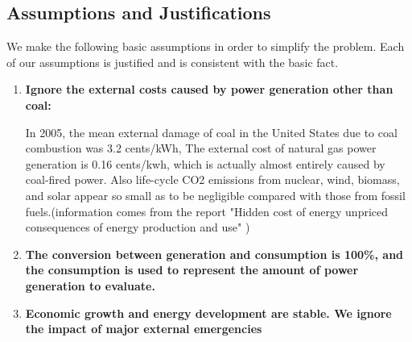 \documentclass{mcmthesis}
\begin{document}
    \subsection{Assumptions and Justifications}
        \noindent
        We make the following basic assumptions in order to simplify the problem. Each of our assumptions is justified and is consistent with the basic fact.
        \begin{enumerate}
            \item \textbf{Ignore the external costs caused by power generation other than coal:}

              In 2005, the mean external damage of coal in the United States due to coal combustion was 3.2 cents/kWh, The external cost of natural gas power generation is 0.16 cents/kwh, which is actually almost entirely caused by coal-fired power. Also life-cycle CO2 emissions from nuclear, wind, biomass, and solar appear so small as to be negligible compared with those from fossil fuels.(information comes from the report "Hidden cost of energy unpriced consequences of energy production and use" )
            \item \textbf{The conversion between generation and consumption is 100\%, and the consumption is used to represent the amount of power generation to evaluate.}
            \item \textbf{Economic growth and energy development are stable. We ignore the impact of major external emergencies}
        \end{enumerate}
\end{document}
